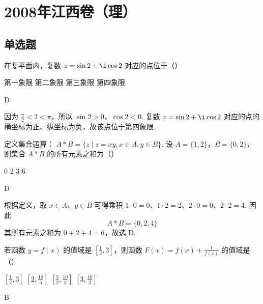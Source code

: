 \chapter{2008年江西卷（理）}

\section{单选题}

\begin{problem}
在复平面内，复数 \(z = \sin 2 + \i\cos 2\) 对应的点位于（\quad）

\choices
    {第一象限}
    {第二象限}
    {第三象限}
    {第四象限}
\end{problem}

\begin{answer}
D
\end{answer}

\begin{solution}
因为 \(\frac{\pi}{2}<2<\pi\)，所以 \(\sin 2>0\)，\(\cos 2<0\). 复数 \(z=\sin 2+\i\cos 2\) 对应的点的横坐标为正、纵坐标为负，故该点位于第四象限.
\end{solution}

\begin{problem}
定义集合运算： \( A * B = \{z \mid z = xy, x \in A, y \in B\} \). 设 \( A = \{1, 2\} \)，\( B = \{0, 2\} \)，则集合 \( A * B \) 的所有元素之和为（\quad）

\choices
    {\(0\)}
    {\(2\)}
    {\(3\)}
    {\(6\)}
\end{problem}

\begin{answer}
D
\end{answer}

\begin{solution}
根据定义，取 \(x\in A\)、\(y\in B\) 可得乘积 \(1\cdot0=0\)、\(1\cdot2=2\)、\(2\cdot0=0\)、\(2\cdot2=4\). 因此
\[
A*B=\{0,2,4\}
\]
其所有元素之和为 \(0+2+4=6\)，故选 D.
\end{solution}

\begin{problem}
若函数 \( y = f(x) \) 的值域是 \( \left[\frac{1}{2}, 3\right] \)，则函数 \( F(x) = f(x) + \frac{1}{f(x)} \) 的值域是（\quad）

\choices
    {\(\left[\frac{1}{2}, 3\right]\)}
    {\(\left[2, \frac{10}{3}\right]\)}
    {\( \left[\frac{5}{2}, \frac{10}{3}\right] \)}
    {\(\left[3, \frac{10}{3}\right]\)}
\end{problem}

\begin{answer}
B
\end{answer}

